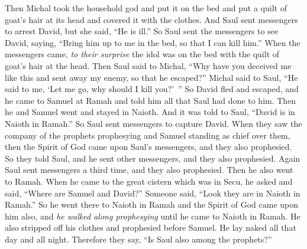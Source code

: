 \begin{biblechapter}
\verse Then Michal took the household god and put it on the bed and put a quilt of goat’s hair at its head and covered it with the clothes.
\verse And Saul sent messengers to arrest David, but she said, “He is ill.”
\verse So Saul sent the messengers to see David, saying, “Bring him up to me in the bed, so that I can kill him.”
\verse When the messengers came, \textit{to their surprise} the idol was on the bed with the quilt of goat’s hair at the head.
\verse Then Saul said to Michal, “Why have you deceived me like this and sent away my enemy, so that he escaped?” Michal said to Saul, “He said to me, ‘Let me go, why should I kill you?’ ”
\verse So David fled and escaped, and he came to Samuel at Ramah and told him all that Saul had done to him. Then he and Samuel went and stayed in Naioth.
\verse And it was told to Saul, “David is in Naioth in Ramah.”
\verse So Saul sent messengers to capture David. When they saw the company of the prophets prophesying and Samuel standing as chief over them, then the Spirit of God came upon Saul’s messengers, and they also prophesied.
\verse So they told Saul, and he sent other messengers, and they also prophesied. Again Saul sent messengers a third time, and they also prophesied.
\verse Then he also went to Ramah. When he came to the great cistern which was in Secu, he asked and said, “Where are Samuel and David?” Someone said, “Look they are in Naioth in Ramah.”
\verse So he went there to Naioth in Ramah and the Spirit of God came upon him also, and \textit{he walked along prophesying} until he came to Naioth in Ramah.
\verse He also stripped off his clothes and prophesied before Samuel. He lay naked all that day and all night. Therefore they say, “Is Saul also among the prophets?”
\end{biblechapter}

